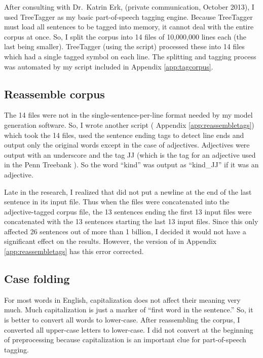 After consulting with Dr.\ Katrin Erk, (private communication, October 2013),
I used TreeTagger \citep{Schmid1994} as my basic part-of-speech 
tagging engine. Because TreeTagger must load all sentences to be tagged into 
memory, it cannot deal with the entire corpus at once. So, I split the corpus 
into 14 files of 10,000,000 lines each (the last being smaller). TreeTagger 
(using the  script) processed these into 14 
files which had a single tagged symbol on each line. The splitting and tagging 
process was automated by my  script included in 
Appendix \ref{app:tagcorpus}.

\subsection{Reassemble corpus}

The 14 files were not in the single-sentence-per-line format needed by my model 
generation software. So, I wrote another script ( 
Appendix \ref{app:reassembletags}) which took the 14 files, used the sentence 
ending tags to detect line ends and output only the original words except in the 
case of adjectives. Adjectives were output with an underscore and the tag JJ 
(which is the tag for an adjective used in the Penn Treebank 
\citep{Marcus1993}). So the word ``kind'' was output as ``kind\_JJ'' if it was 
an adjective.

Late in the research, I realized that  did not 
put a newline at the end of the last sentence in its input file. Thus when the 
files were concatenated into the adjective-tagged corpus file, the 13 sentences 
ending the first 13 input files were concatenated with the 13 sentences starting 
the last 13 input files. Since this only affected 26 sentences out of more than 
1 billion, I decided it would not have a significant effect on the results. 
However, the version of  in Appendix 
\ref{app:reassembletags} has this error corrected.

\subsection{Case folding}

For most words in English, capitalization does not affect their meaning very 
much. Much capitalization is just a marker of ``first word in the sentence.'' 
So, it is better to convert all words to lower-case. After reassembling the 
corpus, I converted all upper-case letters to lower-case. I did not convert at 
the beginning of preprocessing because capitalization is an important clue for 
part-of-speech tagging.

